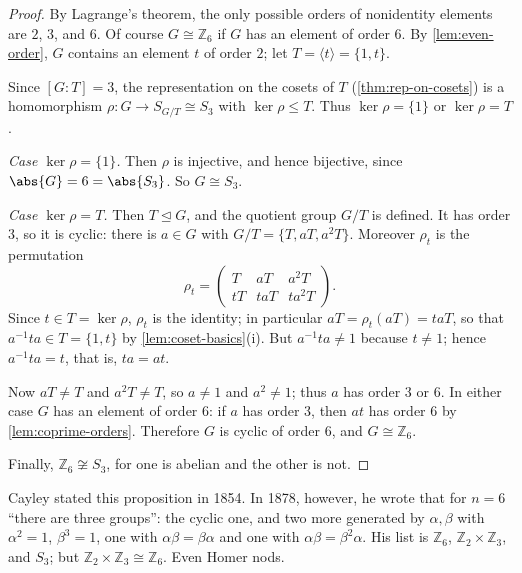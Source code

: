 \begin{proof}
	By Lagrange's theorem, the only possible orders of nonidentity elements are \(2\),
	\(3\), and \(6\). Of course \(G \cong \mathbb Z_6\) if \(G\) has an element of order
	\(6\). By \autoref{lem:even-order}, \(G\) contains an element \(t\) of order \(2\); let
	\(T = \langle t\rangle = \{1, t\}\).

	Since \([G:T] = 3\), the representation on the cosets of \(T\)
	(\autoref{thm:rep-on-cosets}) is a homomorphism \(\rho\colon G \to S_{G/T} \cong S_3\)
	with \(\ker\rho \leq T\). Thus \(\ker\rho = \{1\}\) or \(\ker\rho = T\).

	\emph{Case \(\ker\rho = \{1\}\).} Then \(\rho\) is injective, and hence bijective, since
	\(\abs{G} = 6 = \abs{S_3}\). So \(G \cong S_3\).

	\emph{Case \(\ker\rho = T\).} Then \(T \trianglelefteq G\), and the quotient group
	\(G/T\) is defined. It has order \(3\), so it is cyclic: there is \(a \in G\) with
	\(G/T = \{T, aT, a^2T\}\). Moreover \(\rho_t\) is the permutation
	\[
		\rho_t = \begin{pmatrix} T & aT & a^2T \\ tT & taT & ta^2T \end{pmatrix}.
	\]
	Since \(t \in T = \ker\rho\), \(\rho_t\) is the identity; in particular
	\(aT = \rho_t(aT) = taT\), so that \(a^{-1}ta \in T = \{1, t\}\) by
	\autoref{lem:coset-basics}(i). But \(a^{-1}ta \neq 1\) because \(t \neq 1\); hence
	\(a^{-1}ta = t\), that is, \(ta = at\).

	Now \(aT \neq T\) and \(a^2T \neq T\), so \(a \neq 1\) and \(a^2 \neq 1\); thus \(a\)
	has order \(3\) or \(6\). In either case \(G\) has an element of order \(6\): if \(a\)
	has order \(3\), then \(at\) has order \(6\) by \autoref{lem:coprime-orders}.
	Therefore \(G\) is cyclic of order \(6\), and \(G \cong \mathbb Z_6\).

	Finally, \(\mathbb Z_6 \not\cong S_3\), for one is abelian and the other is not.
\end{proof}

\begin{remark}
	Cayley stated this proposition in 1854. In 1878, however, he wrote that for \(n = 6\)
	``there are three groups'': the cyclic one, and two more generated by \(\alpha, \beta\)
	with \(\alpha^2 = 1\), \(\beta^3 = 1\), one with \(\alpha\beta = \beta\alpha\) and one
	with \(\alpha\beta = \beta^2\alpha\). His list is \(\mathbb Z_6\),
	\(\mathbb Z_2 \times \mathbb Z_3\), and \(S_3\); but
	\(\mathbb Z_2 \times \mathbb Z_3 \cong \mathbb Z_6\). Even Homer nods.
\end{remark}

